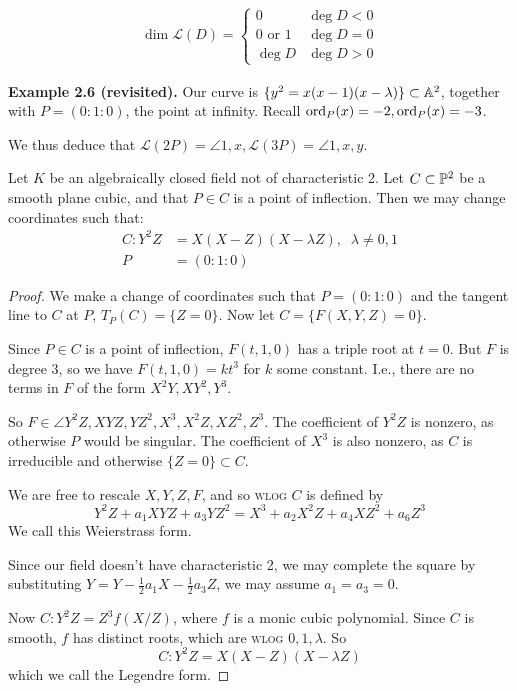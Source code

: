 \documentclass[10pt,a4paper]{article}
\begin{document}
\begin{theorem}
  \begin{align*}
    \dim \mathscr{L}(D) = \begin{cases} 0 & \deg D < 0 \\ 0\text{ or } 1 & \deg D = 0 \\ \deg D & \deg D > 0 \end{cases}
  \end{align*}
\end{theorem}

\textbf{Example 2.6 (revisited).} Our curve is $\{y^2 = x(x-1)(x-\lambda) \} \subset \A^2$, together with $P = (0:1:0)$, the point at infinity. Recall $\ord_P(x) = -2, \ord_P(x) = -3$.

We thus deduce that $\mathscr{L}(2P) = \angle{1, x}, \mathscr{L}(3P) = \angle{1, x, y}$.

\begin{proposition}
  Let $K$ be an algebraically closed field not of characteristic 2. Let $C \subset \P^2$ be a smooth plane cubic, and that $P \in C$ is a point of inflection. Then we may change coordinates such that:
  \begin{align*}
    C: Y^2Z &= X(X-Z)(X-\lambda Z),\;\;\lambda \neq 0, 1\\
    P &= (0:1:0)
  \end{align*}
\end{proposition}
\begin{proof}
  We make a change of coordinates such that $P = (0:1:0)$ and the tangent line to $C$ at $P$, $T_P(C) = \{Z=0\}$. Now let $C = \{F(X,Y,Z) = 0\}$.

  Since $P \in C$ is a point of inflection, $F(t, 1, 0)$ has a triple root at $t = 0$. But $F$ is degree 3, so we have $F(t,1,0) = kt^3$ for $k$ some constant. I.e., there are no terms in $F$ of the form $X^2Y, XY^2, Y^3$.

  So $F \in \angle{Y^2Z, XYZ, YZ^2, X^3, X^2Z, XZ^2, Z^3}$. The coefficient of $Y^2Z$ is nonzero, as otherwise $P$ would be singular. The coefficient of $X^3$ is also nonzero, as $C$ is irreducible and otherwise $\{Z=0\}\subset C$.

  We are free to rescale $X,Y,Z,F$, and so \textsc{wlog} $C$ is defined by \[Y^2Z + a_1XYZ + a_3YZ^2 = X^3+a_2X^2Z+a_4XZ^2+a_6Z^3\]
  We call this Weierstrass form.

  Since our field doesn't have characteristic 2, we may complete the square by substituting $Y = Y - \frac12 a_1X - \frac12 a_3Z$, we may assume $a_1 = a_3 = 0$.

  Now $C: Y^2Z = Z^3f(X/Z)$, where $f$ is a monic cubic polynomial. Since $C$ is smooth, $f$ has distinct roots, which are \textsc{wlog} $0, 1, \lambda$. So \[C : Y^2Z = X(X-Z)(X-\lambda Z)\]which we call the Legendre form.
\end{proof}
\end{document}
